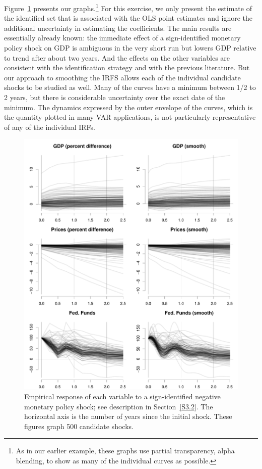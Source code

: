 \documentclass[12pt,fleqn]{article}
\begin{document}
Figure~\ref{fig:5} presents our graphs.\footnote{%
  As in our earlier example, these graphs use partial transparency,
  alpha blending, to show as many of the individual curves as
  possible.} %
For this exercise, we only present the estimate of the identified set
that is associated with the OLS point estimates and ignore the
additional uncertainty in estimating the coefficients. The main
results are essentially already known: the immediate effect of a
sign-identified monetary policy shock on GDP is ambiguous in the very
short run but lowers GDP relative to trend after about two years. And
the effects on the other variables are consistent with the
identification strategy and with the previous literature. But our
approach to smoothing the IRFS allows each of the individual candidate
shocks to be studied as well. Many of the curves have a minimum
between 1/2 to 2 years, but there is considerable uncertainty over the
exact date of the minimum.  The dynamics expressed by the outer
envelope of the curves, which is the quantity plotted in many VAR
applications, is not particularly representative of any of the
individual IRFs.

\begin{figure}[t]
  \centering
  \includegraphics[width=6.5in]{graphs/empirics}
  \caption{%
    Empirical response of each variable to a sign-identified negative
    monetary policy shock; see description in Section~\ref{S3.2}. The
    horizontal axis is the number of years since the initial
    shock. These figures graph 500 candidate shocks.}
  \label{fig:5}
\end{figure}
\end{document}
